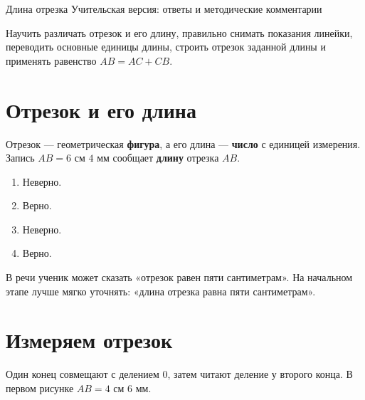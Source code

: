 
\worksheettitle
  {Длина отрезка}
  {Учительская версия: ответы и методические комментарии}

\begin{teacherbox}
  Научить различать отрезок и его длину, правильно снимать показания
  линейки, переводить основные единицы длины, строить отрезок заданной длины
  и применять равенство \(AB=AC+CB\).
\end{teacherbox}

\section{Отрезок и его длина}

\segmentlengthfigure

\begin{propertybox}[Ответ]
  Отрезок — геометрическая \textbf{фигура}, а его длина — \textbf{число} с
  единицей измерения. Запись \(AB=6\text{ см }4\text{ мм}\) сообщает
  \textbf{длину} отрезка \(AB\).
\end{propertybox}

\begin{practicebox}
  \begin{enumerate}[label=\textbf{\arabic*.},itemsep=0.35em]
    \item Неверно.
    \item Верно.
    \item Неверно.
    \item Верно.
  \end{enumerate}
\end{practicebox}

\begin{teacherbox}[Диагностика]
  В речи ученик может сказать «отрезок равен пяти сантиметрам». На начальном
  этапе лучше мягко уточнять: «длина отрезка равна пяти сантиметрам».
\end{teacherbox}

\section{Измеряем отрезок}

\correctmeasurementfigure

\begin{propertybox}[Алгоритм]
  Один конец совмещают с делением \(0\), затем читают деление у второго
  конца. В первом рисунке \(AB=4\text{ см }6\text{ мм}\).
\end{propertybox}

